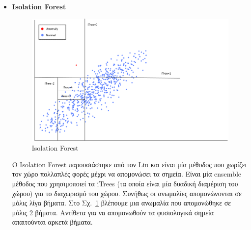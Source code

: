 \documentclass[a4paper,12pt]{report}
\theoremstyle{definitionNODot}
\begin{document}
\begin{itemize}
\begin{enumerate}
			$$LRD_k(s_i) = \Biggl ( \quad \frac{\sum\limits_{s\in N_k(s_i)}^{} RD_k(s_i,s)}{| N_k(s_i) |} \quad \Biggl )^{-1}$$
			
			\item \textbf{τελικά υπολογίζουμε τον LOF.}  
			$$LOF(s_i)=\frac{\mathlarger{\sum}\limits_{s\in N_k(s_i)}^{} \frac{LRD_k(s)}{LRD_k(s_i)}}{| N_k(s_i) |}$$
		\end{enumerate}
		
		Το LOF χρησιμοποιείται σαν σκορ ανωμαλίας έτσι θέτοντας ένα φράγμα μπορούμε να αποφασίσουμε αν ένα σημείο είναι ανωμαλία ή όχι.
		
		Οι δυσκολίες που αντιμετωπίζουμε με αυτόν τον αλγόριθμο είναι αρκετές. Καταρχήν πρέπει να βρούμε το κατάλληλο $k$ και την κατάλληλη συνάρτηση απόστασης $d$. Αν και η Ευκλείδεια απόσταση δουλεύει αρκετά καλά πολλές φορές δεν μας δίνει αξιόπιστα αποτελέσματα. Επιπλέον ο αλγόριθμος αναφέρεται στην "τοπικότητα". Μία άλλη δυσκολία είναι ότι ο χρόνος στις χρονοσειρές δίνει σημαντικές πληροφορίες κάτι το οποίο δεν το εκμεταλλεύεται ο αλγόριθμος. Τέλος είναι κοστίζει πολύ υπολογιστικά διότι η πολυπλοκότητά του είναι $O(n^2)$.
		
		\item \textbf{Isolation Forest}
		
		\begin{figure}[h]
			\centering
			\includegraphics[width=\textwidth]{iTrees.png}
			\caption{Isolation Forest}
			\label{fig:iTrees}
		\end{figure}
		
		O Isolation Forest παρουσιάστηκε από τον Liu \cite{TonyMingZhiHua2008IsolationForest} και είναι μία μέθοδος που χωρίζει τον χώρο πολλαπλές φορές μέχρι να απομονώσει τα σημεία. Είναι μία ensemble μέθοδος που χρησιμοποιεί τα iTrees (τα οποία είναι μία δυαδική διαμέριση του χώρου) για το διαχωρισμό του χώρου. Συνήθως οι ανωμαλίες απομονώνονται σε μόλις λίγα βήματα. Στο Σχ.~\ref{fig:iTrees} βλέπουμε μια ανωμαλία που απομονώθηκε σε μόλις 2 βήματα. Αντίθετα για να απομονωθούν τα φυσιολογικά σημεία απαιτούνται αρκετά βήματα.
		

\end{itemize}
\end{document}
